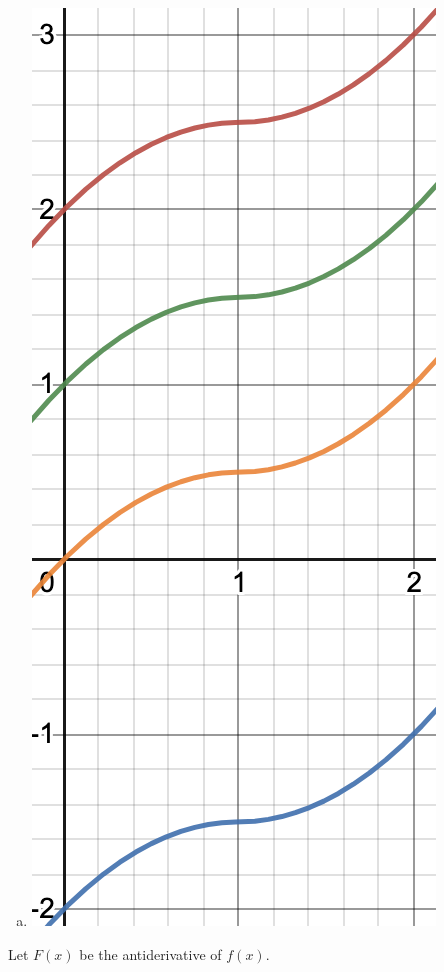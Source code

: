 \documentclass[11pt]{exam}
\begin{document}
\begin{questions}
\begin{solution}
\begin{multicols}{2}
\begin{enumerate}[(a)]
    \item \includegraphics[scale=0.7]{1d}
    \end{enumerate}
  \end{multicols}
\end{solution}
\question Let \(F(x)\) be the antiderivative of \(f(x)\).
\end{questions}
\end{document}
